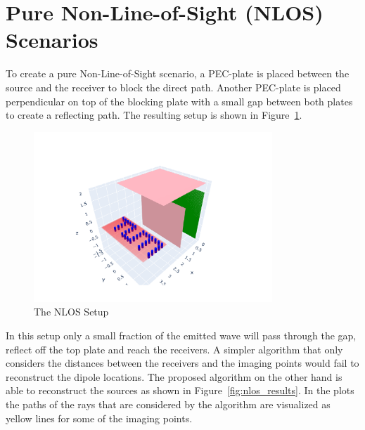 \section{Pure Non-Line-of-Sight (NLOS) Scenarios}
To create a pure Non-Line-of-Sight scenario, a PEC-plate is placed between the source and the receiver to block the direct path.
Another PEC-plate is placed perpendicular on top of the blocking plate with a small gap between both plates to create a reflecting path.
The resulting setup is shown in Figure~\ref{fig:nlos_setup}.

\begin{figure}[ht]
    \centering
    \includegraphics[width=0.8\textwidth]{figures/nlos_setup.pdf}
    \caption{The NLOS Setup}\label{fig:nlos_setup}
\end{figure}

In this setup only a small fraction of the emitted wave will pass through the gap, reflect off the top plate and reach the receivers.
A simpler algorithm that only considers the distances between the receivers and the imaging points would fail to reconstruct the dipole locations.
The proposed algorithm on the other hand is able to reconstruct the sources as shown in Figure~\ref{fig:nlos_results}.
In the plots the paths of the rays that are considered by the algorithm are visualized as yellow lines for some of the imaging points.

